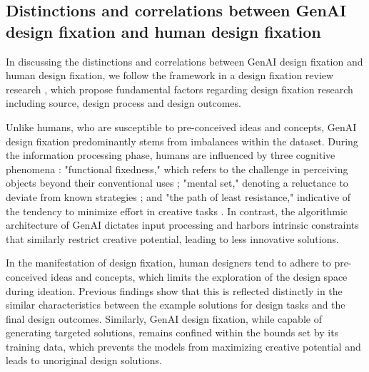 

\subsection{Distinctions and correlations between GenAI design fixation and human design fixation}
In discussing the distinctions and correlations between GenAI design fixation and human design fixation, we follow the framework in a design fixation review research \cite{alipour2018review}, which propose fundamental factors regarding design fixation research including source, design process and design outcomes. 


Unlike humans, who are susceptible to pre-conceived ideas and concepts, GenAI design fixation predominantly stems from imbalances within the dataset. During the information processing phase, humans are influenced by three cognitive phenomena \cite{jansson1991design}: "functional fixedness," which refers to the challenge in perceiving objects beyond their conventional uses \cite{duncker1945problem}; "mental set," denoting a reluctance to deviate from known strategies \cite{luchins1959rigidity}; and "the path of least resistance," indicative of the tendency to minimize effort in creative tasks \cite{ward1994structured}. In contrast, the algorithmic architecture of GenAI dictates input processing and harbors intrinsic constraints that similarly restrict creative potential, leading to less innovative solutions.

In the manifestation of design fixation, human designers tend to adhere to pre-conceived ideas and concepts, which limits the exploration of the design space during ideation. Previous findings show that this is reflected distinctly in the similar characteristics between the example solutions for design tasks and the final design outcomes. Similarly, GenAI design fixation, while capable of generating targeted solutions, remains confined within the bounds set by its training data, which prevents the models from maximizing creative potential and leads to unoriginal design solutions.

